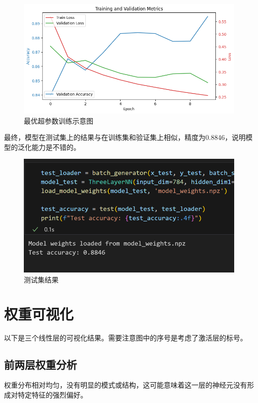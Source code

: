 \documentclass[a4paper,12pt]{article}
\begin{document}
\begin{figure}[H]
    \centering
    \includegraphics[width=1\textwidth]{train_graph.png}
    \caption{最优超参数训练示意图}
    \label{fig:example}
\end{figure}

最终，模型在测试集上的结果与在训练集和验证集上相似，精度为0.8846，说明模型的泛化能力是不错的。

\begin{figure}[H]
    \centering
    \includegraphics[width=1\textwidth]{test.png}
    \caption{测试集结果}
    \label{fig:example}
\end{figure}

\section{权重可视化}
以下是三个线性层的可视化结果。需要注意图中的序号是考虑了激活层的标号。

\subsection{前两层权重分析}

权重分布相对均匀，没有明显的模式或结构，这可能意味着这一层的神经元没有形成对特定特征的强烈偏好。
\end{document}

